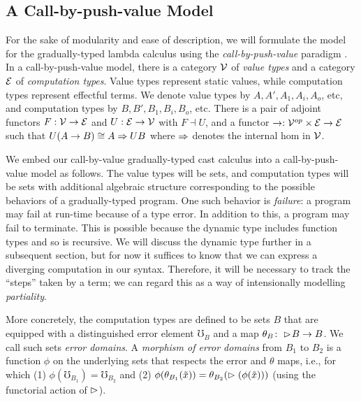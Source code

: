 \subsection{A Call-by-push-value Model}


For the sake of modularity and ease of description, we will formulate the model
for the gradually-typed lambda calculus using the \emph{call-by-push-value}
paradigm \cite{levy99}. In a call-by-push-value model, there is a
category $\mathcal{V}$ of \emph{value types} and a category $\mathcal{E}$ of
\emph{computation types}. Value types represent static values, while computation
types represent effectful terms. We denote value types by $A, A', A_1, A_i,
A_o$, etc, and computation types by $B, B', B_1, B_i, B_o$, etc. There is a pair
of adjoint functors $F : \mathcal{V} \to \mathcal{E}$ and $U : \mathcal{E} \to \mathcal{V}$ with $F
\dashv U$, and a functor $\to : \mathcal{V}^{op} \times \mathcal{E} \to \mathcal{E}$ such that
$U(A \to B) \cong A \Rightarrow UB$ where $\Rightarrow$ denotes the internal hom in $\mathcal{V}$.


We embed our call-by-value gradually-typed cast calculus into a
call-by-push-value model as follows. The value types will be sets, and
computation types will be sets with additional algebraic structure corresponding
to the possible behaviors of a gradually-typed program. One such behavior is
\emph{failure}: a program may fail at run-time because of a type error. In
addition to this, a program may fail to terminate. This is possible because the
dynamic type includes function types and so is recursive. We will discuss the
dynamic type further in a subsequent section, but for now it suffices to know
that we can express a diverging computation in our syntax. Therefore, it will be
necessary to track the ``steps'' taken by a term; we can regard this as a way of
intensionally modelling \emph{partiality}.

More concretely, the computation types are defined to be sets $B$ that are
equipped with a distinguished error element $\mho_B$ and a map $\theta_B \colon
\vartriangleright \hspace{-0.2em} B \to B$. We call such sets \emph{error domains}. A \emph{morphism of
error domains} from $B_1$ to $B_2$ is a function $\phi$ on the underlying sets
that respects the error and $\theta$ maps, i.e., for which 
%
(1) $\phi(\mho_{B_1}) = \mho_{B_2}$ and
%
(2) $\phi(\theta_{B_1}(\tilde{x})) = \theta_{B_2}(\vartriangleright (\phi(\tilde{x})))$
(using the functorial action of $\vartriangleright$).

